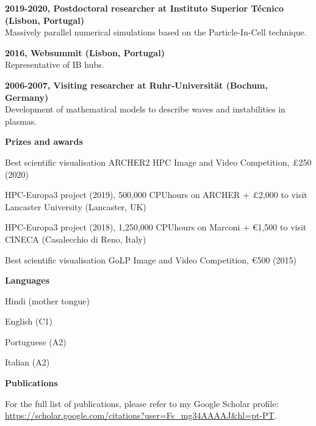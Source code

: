 \documentclass[a4paper,10pt,final]{memoir}
\newcommand{\Sep}{\vspace{0.8cm}}
\newcommand{\SmallSep}{\vspace{0.3cm}}
\newcommand{\CVSection}[1]
	{\Large\textbf{#1}\par
	\SmallSep\normalsize\normalfont}
\newcommand{\CVItem}[1]
	{\textbf{\color{RoyalBlue} #1}}
\begin{document}
\CVItem{2019-2020, Postdoctoral researcher at Instituto Superior T\'ecnico (Lisbon, Portugal)}\\
Massively parallel numerical simulations based on the Particle-In-Cell technique.
\SmallSep

\CVItem{2016, Websummit (Lisbon, Portugal)}\\
Representative of IB hubs. 
\SmallSep

\CVItem{2006-2007, Visiting researcher at Ruhr-Universit\"{a}t (Bochum, Germany)}\\
Development of mathematical models to describe waves and instabilities in plasmas. 
\Sep

\CVSection{Prizes and awards}
\begin{compactitem}[\color{RoyalBlue}$\circ$]
\item Best scientific visualisation ARCHER2 HPC Image and Video Competition, \pounds 250 (2020)
\item HPC-Europa3 project (2019), 500,000 CPUhours on ARCHER + \pounds 2,000 to visit Lancaster University (Lancaster, UK)
\item HPC-Europa3 project (2018), 1,250,000 CPUhours on Marconi + \euro 1,500 to visit CINECA (Casalecchio di Reno, Italy)
\item Best scientific visualisation GoLP Image and Video Competition, \euro 500 (2015)
\end{compactitem}
\Sep

\CVSection{Languages}
\begin{compactitem}[\color{RoyalBlue}$\circ$]
\item Hindi (mother tongue)
\item English (C1)
\item Portuguese (A2)
\item Italian (A2)
\end{compactitem}
\Sep

\CVSection{Publications}
For the full list of publications, please refer to my Google Scholar profile:\\ 
\url{https://scholar.google.com/citations?user=Fs_mg34AAAAJ&hl=pt-PT}.\\ 



\end{document}
